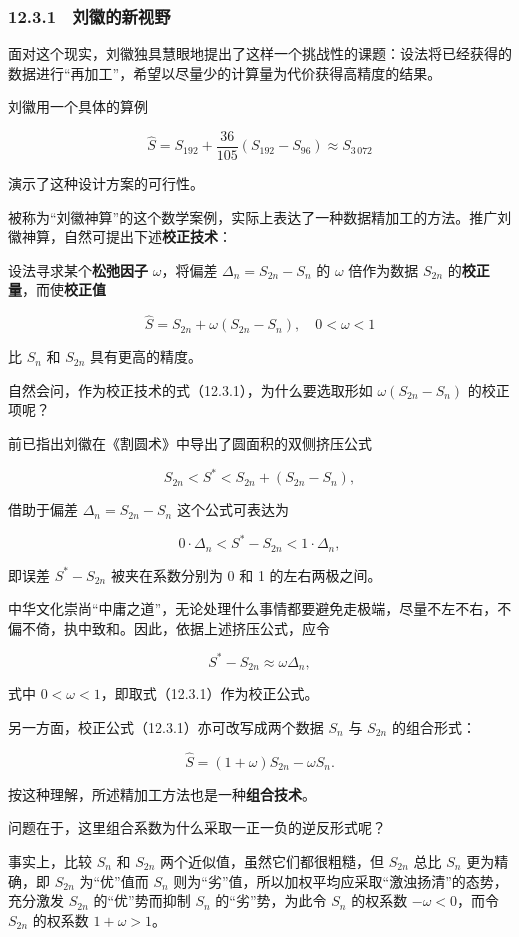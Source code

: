 \documentclass[
  10pt,
  fontset=fandol]{ctexart}
\begin{document}
\subsubsection{12.3.1　刘徽的新视野}\label{ux5218ux5fbdux7684ux65b0ux89c6ux91ce}

面对这个现实，刘徽独具慧眼地提出了这样一个挑战性的课题：设法将已经获得的数据进行``再加工''，希望以尽量少的计算量为代价获得高精度的结果。

刘徽用一个具体的算例

\[
\widehat S=S_{192}+\frac{36}{105}(S_{192}-S_{96})\approx S_{3\,072}
\]

演示了这种设计方案的可行性。

被称为``刘徽神算''的这个数学案例，实际上表达了一种数据精加工的方法。推广刘徽神算，自然可提出下述\textbf{校正技术}：

设法寻求某个\textbf{松弛因子} \(\omega\)，将偏差 \(\Delta_n=S_{2n}-S_n\) 的 \(\omega\) 倍作为数据 \(S_{2n}\) 的\textbf{校正量}，而使\textbf{校正值}

\[
\widehat S=S_{2n}+\omega(S_{2n}-S_n),\quad 0<\omega<1
\tag{12.3.1}
\]

比 \(S_n\) 和 \(S_{2n}\) 具有更高的精度。

自然会问，作为校正技术的式（12.3.1），为什么要选取形如 \(\omega(S_{2n}-S_n)\) 的校正项呢？

前已指出刘徽在《割圆术》中导出了圆面积的双侧挤压公式

\[
S_{2n}<S^*<S_{2n}+(S_{2n}-S_n),
\]

借助于偏差 \(\Delta_n=S_{2n}-S_n\) 这个公式可表达为

\[
0\cdot\Delta_n<S^*-S_{2n}<1\cdot\Delta_n,
\]

即误差 \(S^*-S_{2n}\) 被夹在系数分别为 0 和 1 的左右两极之间。

中华文化崇尚``中庸之道''，无论处理什么事情都要避免走极端，尽量不左不右，不偏不倚，执中致和。因此，依据上述挤压公式，应令

\[
S^*-S_{2n}\approx\omega\Delta_n,
\]

式中 \(0<\omega<1\)，即取式（12.3.1）作为校正公式。

另一方面，校正公式（12.3.1）亦可改写成两个数据 \(S_n\) 与 \(S_{2n}\) 的组合形式：

\[
\widehat S=(1+\omega)S_{2n}-\omega S_n.
\]

按这种理解，所述精加工方法也是一种\textbf{组合技术}。

问题在于，这里组合系数为什么采取一正一负的逆反形式呢？

事实上，比较 \(S_n\) 和 \(S_{2n}\) 两个近似值，虽然它们都很粗糙，但 \(S_{2n}\) 总比 \(S_n\) 更为精确，即 \(S_{2n}\) 为``优''值而 \(S_n\) 则为``劣''值，所以加权平均应采取``激浊扬清''的态势，充分激发 \(S_{2n}\) 的``优''势而抑制 \(S_n\) 的``劣''势，为此令 \(S_n\) 的权系数 \(-\omega<0\)，而令 \(S_{2n}\) 的权系数 \(1+\omega>1\)。
\end{document}
